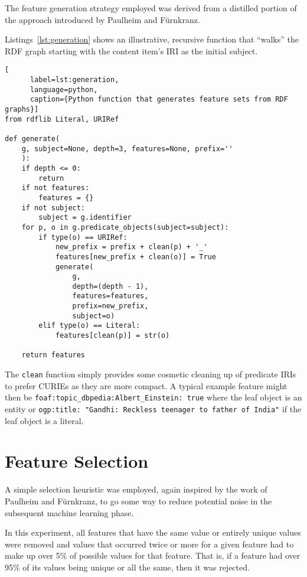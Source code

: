 The feature generation strategy employed was derived from a distilled
portion of the approach introduced by Paulheim
and F\"urnkranz\cite{paulheim2012unsupervised}.

Listings~\ref{lst:generation} shows an illustrative, recursive
function that ``walks'' the RDF graph starting with the content
item's IRI as the initial subject.

\begin{centering}
  \begin{lstlisting}[
      label=lst:generation,
      language=python,
      caption={Python function that generates feature sets from RDF graphs}]
from rdflib Literal, URIRef
    
def generate(
    g, subject=None, depth=3, features=None, prefix=''
    ):
    if depth <= 0:
        return
    if not features:
        features = {}
    if not subject:
        subject = g.identifier
    for p, o in g.predicate_objects(subject=subject):
        if type(o) == URIRef:
            new_prefix = prefix + clean(p) + '_'
            features[new_prefix + clean(o)] = True
            generate(
                g,
                depth=(depth - 1),
                features=features,
                prefix=new_prefix,
                subject=o)
        elif type(o) == Literal:
            features[clean(p)] = str(o)

    return features
  \end{lstlisting}
\end{centering}

The \texttt{clean} function simply provides some cosmetic cleaning
up of predicate IRIs to prefer CURIEs as they are more compact. A
typical example feature might then be
\texttt{foaf:topic\_dbpedia:Albert\_Einstein: true} where the leaf
object is an entity or
\texttt{ogp:title: "Gandhi: Reckless teenager to father of India"} if
the leaf object is a literal.

\section{Feature Selection}

A simple selection heuristic was employed, again inspired by the work
of Paulheim and F\"urnkranz\cite{paulheim2012unsupervised}, to go
some way to reduce potential noise in the subsequent machine learning
phase.

In this experiment, all features that have the same value or entirely
unique values were removed and values that occurred twice or more
for a given feature had to make up over 5\% of possible values for
that feature. That is, if a feature had over 95\% of its values being
unique or all the same, then it was rejected.

